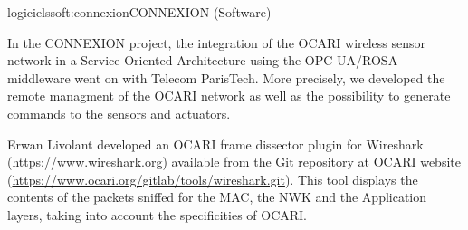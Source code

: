 \documentclass{ra2016}
\begin{document}
\begin{module}{logiciels}{soft:connexion}{CONNEXION (Software)} 

\begin{participants}
\end{participants}

%


In the CONNEXION project, the integration of the OCARI wireless sensor network
in a Service-Oriented Architecture using the OPC-UA/ROSA middleware went on with Telecom ParisTech. More precisely, we developed the remote managment of the OCARI network as well as the possibility to generate commands to the sensors and actuators. 


Erwan Livolant developed an OCARI frame dissector plugin for Wireshark (\url{https://www.wireshark.org}) available from the Git repository at OCARI website  (\url{https://www.ocari.org/gitlab/tools/wireshark.git}). This tool displays the contents of the packets sniffed for the MAC, the NWK and the Application layers, taking into account the specificities of OCARI.

\end{module}
\end{document}
